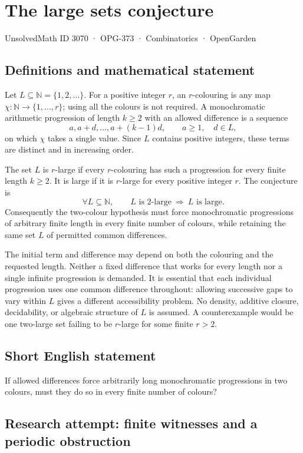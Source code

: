 \documentclass[11pt,a4paper]{article}
\begin{document}
\section*{The large sets conjecture}\label{3070}
{\small UnsolvedMath ID 3070 · OPG-373 · Combinatorics · OpenGarden}
\subsection{Definitions and mathematical statement}
Let $L\subseteq\mathbb N=\{1,2,\ldots\}$. For a positive integer $r$,
an $r$-colouring is any map $\chi:\mathbb N\to\{1,\ldots,r\}$; using
all the colours is not required. A monochromatic arithmetic progression
of length $k\ge2$ with an allowed difference is a sequence
\[
 a,a+d,\ldots,a+(k-1)d,\qquad a\ge1,\quad d\in L,
\]
on which $\chi$ takes a single value. Since $L$ contains positive integers,
these terms are distinct and in increasing order.

The set $L$ is $r$-large if every $r$-colouring has such a progression
for every finite length $k\ge2$. It is large if it is $r$-large for every
positive integer $r$.
The conjecture is
\[
 \forall L\subseteq\mathbb N,\qquad
 L\text{ is }2\text{-large}\ \Longrightarrow\ L\text{ is large}.
\]
Consequently the two-colour hypothesis must force monochromatic
progressions of arbitrary finite length in every finite number of colours,
while retaining the same set $L$ of permitted common differences.

The initial term and difference may depend on both the colouring and the
requested length. Neither a fixed difference that works for every length
nor a single infinite progression is demanded. It is essential that each
individual progression uses one common difference throughout: allowing
successive gaps to vary within $L$ gives a different accessibility problem.
No density, additive closure, decidability, or algebraic structure of $L$
is assumed. A counterexample would be one two-large set failing to be
$r$-large for some finite $r>2$.
\subsection{Short English statement}
If allowed differences force arbitrarily long monochromatic progressions in two colours, must they do so in every finite number of colours?
\subsection{Research attempt: finite witnesses and a periodic obstruction}
\end{document}
